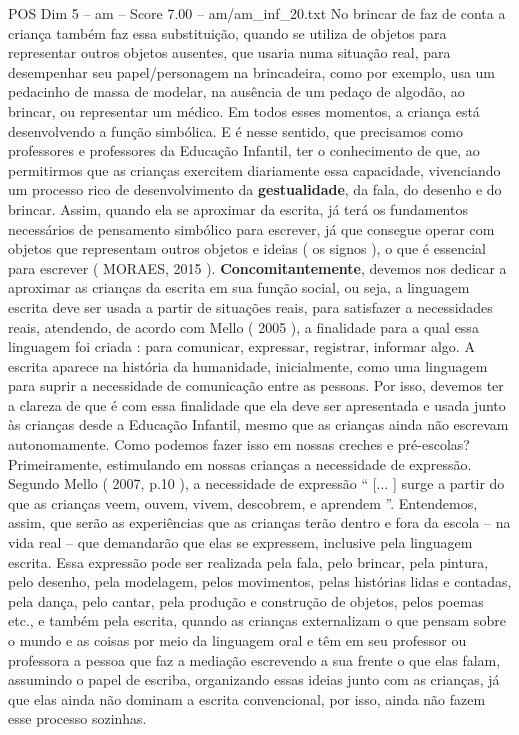 \begin{textsample}{POS Dim 5 – am – Score 7.00 – am/am\_inf\_20.txt}
No brincar de faz de conta a criança também faz essa substituição, quando se utiliza de objetos para representar outros objetos ausentes, que usaria numa situação real, para desempenhar seu papel/personagem na brincadeira, como por exemplo, usa um pedacinho de massa de modelar, na ausência de um pedaço de algodão, ao brincar, ou representar um médico.
Em todos esses momentos, a criança está desenvolvendo a função simbólica.
E é nesse sentido, que precisamos como professores e professores da Educação Infantil, ter o conhecimento de que, ao permitirmos que as crianças exercitem diariamente essa capacidade, vivenciando um processo rico de desenvolvimento da \textbf{gestualidade}, da fala, do desenho e do brincar.
Assim, quando ela se aproximar da escrita, já terá os fundamentos necessários de pensamento simbólico para escrever, já que consegue operar com objetos que representam outros objetos e ideias ( os signos ), o que é essencial para escrever ( MORAES, 2015 ). \textbf{Concomitantemente}, devemos nos dedicar a aproximar as crianças da escrita em sua função social, ou seja, a linguagem escrita deve ser usada a partir de situações reais, para satisfazer a necessidades reais, atendendo, de acordo com Mello ( 2005 ), a finalidade para a qual essa linguagem foi criada : para comunicar, expressar, registrar, informar algo.
A escrita aparece na história da humanidade, inicialmente, como uma linguagem para suprir a necessidade de comunicação entre as pessoas.
Por isso, devemos ter a clareza de que é com essa finalidade que ela deve ser apresentada e usada junto às crianças desde a Educação Infantil, mesmo que as crianças ainda não escrevam autonomamente.
Como podemos fazer isso em nossas creches e pré-escolas?
Primeiramente, estimulando em nossas crianças a necessidade de expressão.
Segundo Mello ( 2007, p.10 ), a necessidade de expressão “ [... ] surge a partir do que as crianças veem, ouvem, vivem, descobrem, e aprendem ”.
Entendemos, assim, que serão as experiências que as crianças terão dentro e fora da escola – na vida real – que demandarão que elas se expressem, inclusive pela linguagem escrita.
Essa expressão pode ser realizada pela fala, pelo brincar, pela pintura, pelo desenho, pela modelagem, pelos movimentos, pelas histórias lidas e contadas, pela dança, pelo cantar, pela produção e construção de objetos, pelos poemas etc., e também pela escrita, quando as crianças externalizam o que pensam sobre o mundo e as coisas por meio da linguagem oral e têm em seu professor ou professora a pessoa que faz a mediação escrevendo a sua frente o que elas falam, assumindo o papel de escriba, organizando essas ideias junto com as crianças, já que elas ainda não dominam a escrita convencional, por isso, ainda não fazem esse processo sozinhas.

\end{textsample}
